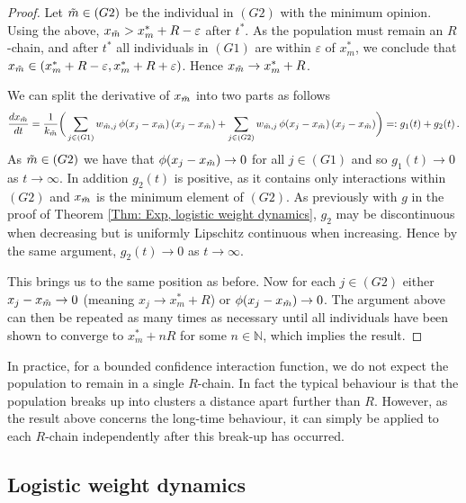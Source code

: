 \documentclass{article}
\begin{document}
\begin{proof}
    Let $\Tilde{m} \in (G2)$ be the individual in $(G2)$ with the minimum opinion. Using the above, $x_{\Tilde{m}} > x_m^* + R - \varepsilon$ after $t^*$. As the population must remain an $R$-chain, and after $t^*$ all individuals in $(G1)$ are within $\varepsilon$ of $x_m^*$, we conclude that $x_{\Tilde{m}} \in (x_m^* + R - \varepsilon, x_m^* + R + \varepsilon)$. Hence $x_{\Tilde{m}} \rightarrow x_m^* + R$. 
        
    We can split the derivative of $x_{\Tilde{m}}$ into two parts as follows
    \begin{align*}
        \frac{dx_{\Tilde{m}}}{dt} = \frac{1}{k_{\Tilde{m}}} \bigg( \sum_{j\in(G1)} w_{\Tilde{m},j}\,\phi(x_j - x_{\Tilde{m}})\,(x_j - x_{\Tilde{m}}) + \sum_{j\in(G2)} w_{\Tilde{m},j}\,\phi(x_j - x_{\Tilde{m}})\,(x_j - x_{\Tilde{m}}) \bigg) =: g_1(t) + g_2(t)\,.
    \end{align*}
    As $\Tilde{m}\in(G2)$ we have that $\phi(x_j - x_{\Tilde{m}})\rightarrow 0$ for all $j \in(G1)$ and so $g_1(t)\rightarrow 0$ as $t\rightarrow\infty$. In addition $g_2(t)$ is positive, as it contains only interactions within $(G2)$ and $x_{\Tilde{m}}$ is the minimum element of $(G2)$. As previously with $g$ in the proof of Theorem \ref{Thm: Exp, logistic weight dynamics}, $g_2$ may be discontinuous when decreasing but is uniformly Lipschitz continuous when increasing. Hence by the same argument, $g_2(t)\rightarrow 0$ as $t \rightarrow \infty$. 

    This brings us to the same position as before. Now for each $j\in (G2)$ either $x_j - x_{\Tilde{m}} \rightarrow 0$ (meaning $x_j \rightarrow x_m^* + R$) or $\phi(x_j - x_{\Tilde{m}})\rightarrow 0$. The argument above can then be repeated as many times as necessary until all individuals have been shown to converge to $x_m^* + nR$ for some $n\in\mathbb{N}$, which implies the result. 
\end{proof}

\begin{remark}
    In practice, for a bounded confidence interaction function, we do not expect the population to remain in a single $R$-chain. In fact the typical behaviour is that the population breaks up into clusters a distance apart further than $R$. However, as the result above concerns the long-time behaviour, it can simply be applied to each $R$-chain independently after this break-up has occurred. 
\end{remark}

\subsection{Logistic weight dynamics} \label{Section: BC, Logistic}
\end{document}
